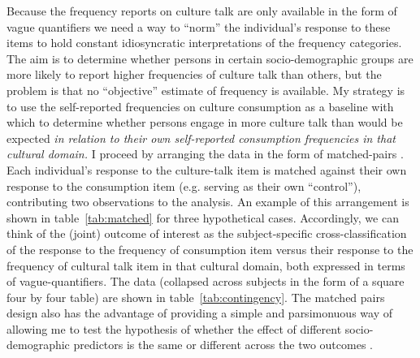 Because the frequency reports on culture talk are only available in the form of vague quantifiers we need a way to ``norm'' the individual's response to these items to hold constant idiosyncratic interpretations of the frequency categories.  The aim is to determine whether persons in certain socio-demographic groups are more likely to report higher frequencies of culture talk than others, but the problem is that no ``objective'' estimate of frequency is available. My strategy is to use the self-reported frequencies on culture consumption as a baseline with which to determine whether persons engage in more culture talk than would be expected \emph{in relation to their own self-reported consumption frequencies in that cultural domain.} I proceed by arranging the data in the form of matched-pairs \citep[247-256]{agresti07}.  Each individual's response to the culture-talk item is matched against their own response to the consumption item (e.g. serving as their own ``control''), contributing two observations to the analysis.  An example of this arrangement is shown in table~\ref{tab:matched} for three hypothetical cases.   Accordingly, we can think of the (joint) outcome of interest as the subject-specific cross-classification of the response to the frequency of consumption item versus their response to the frequency of cultural talk item in that cultural domain, both expressed in terms of vague-quantifiers.  The data (collapsed across subjects in the form of a square four by four table) are shown in table~\ref{tab:contingency}.  The matched pairs design also has the advantage of providing a simple and parsimonuous way of allowing me to test the hypothesis of whether the effect of different socio-demographic predictors is the same or different across the two outcomes \citep[Pp.]{agresti07}.

